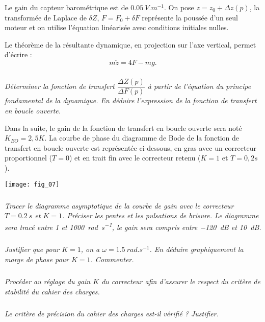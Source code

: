 \begin{multicols}{2}
Le gain du capteur barométrique est de $\SI{0,05}{V.m^{-1}}$. On pose $z=z_0+\Delta z(p)$, la transformée de Laplace de $\delta Z$, $F=F_0 + \delta F$ représente la poussée d'un seul moteur et on utilise l'équation linéarisée avec conditions initiales nulles.

Le théorème de la résultante dynamique, en projection sur l’axe vertical, permet d’écrire :
$$ m\ddot{z} =4F-mg. $$


\subparagraph{}\textit{Déterminer la fonction de transfert $\dfrac{\Delta Z(p)}{\Delta F(p)}$ à partir de l'équation du principe fondamental de la dynamique. En déduire l'expression de la fonction de transfert en boucle ouverte. }
\ifprof
\begin{corrige}
\end{corrige}
\else
\fi

Dans la suite, le gain de la fonction de transfert en boucle ouverte sera noté $K_{BO}=2,5 K$.
La courbe de phase du diagramme de Bode de la fonction de transfert en boucle ouverte est représentée ci-dessous, en gras avec un correcteur proportionnel ($T=0$) et en trait fin avec le correcteur retenu ($K=1$ et $T=0,2s$).


\begin{center}
\texttt{[image: fig\_07]}
\end{center}


\subparagraph{}\textit{Tracer le diagramme asymptotique de la courbe de gain avec le correcteur $T=\SI{0,2}{s}$ et $K=1$.
Préciser les pentes et les pulsations de brisure. Le diagramme sera tracé entre 1 et \SI{1000}{rad.s^{-1}}, le gain sera compris entre \SI{-120}{dB} et \SI{+10}{dB}.}
\ifprof
\begin{corrige}
\end{corrige}
\else
\fi

\subparagraph{}\textit{Justifier que pour $K=1$, on a $\omega=\SI{1,5}{rad.s^{-1}}$. En déduire graphiquement la marge de phase pour
$K=1$. Commenter.}

\subparagraph{}\textit{Procéder au réglage du gain $K$ du correcteur afin d’assurer le respect du critère de stabilité du cahier des charges.}
\ifprof
\begin{corrige}
\end{corrige}
\else
\fi

\subparagraph{}\textit{Le critère de précision du cahier des charges est-il vérifié ? Justifier.}
\ifprof
\begin{corrige}
\end{corrige}
\else
\fi


\end{multicols}
